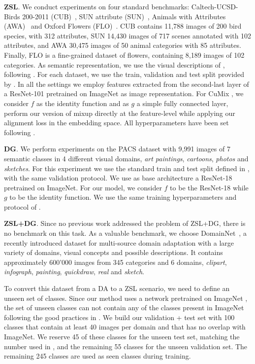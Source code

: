 \documentclass[runningheads]{llncs}
\newcommand{\myparagraph}[1]{\noindent\textbf{#1}}
\newcommand{\methodName}{{CuMix} }
\begin{document}
\myparagraph{ZSL}. We conduct experiments on {four} standard benchmarks: Caltech-UCSD-Birds 200-2011 (CUB)~\cite{welinder2010cub}, SUN attribute (SUN)~\cite{patterson2012sun}, Animals with Attributes (AWA)~\cite{lampert2013awa} and Oxford Flowers (FLO)~\cite{nilsback2008flo}. CUB contains 11,788 images of 200 bird species, with 312 attributes, SUN 14,430 images of 717 scenes annotated with 102 attributes, and AWA 30,475 images of 50 animal categories with 85 attributes. Finally, FLO is a fine-grained dataset of flowers, containing 8,189 images of 102 categories. As semantic representation, we use the visual descriptions of \cite{reed2016learning}, following 
\cite{xian2018feature,xian2019semantic}. For each dataset, we use the train, validation and test split provided by \cite{xian2018zeroshotgood}. In all the settings we employ features extracted from the second-last layer of a ResNet-101 \cite{he2016deep} pretrained on ImageNet as image representation. For \methodName, we consider $f$ as the identity function and as $g$ a simple fully connected layer, perform our version of mixup directly at the feature-level while applying our alignment loss in the embedding space. All hyperparameters have been set following \cite{xian2018zeroshotgood}.

\myparagraph{DG}. We perform experiments on the PACS dataset \cite{li2017deeper}with 9,991 images of 7 semantic classes in 4 different visual domains, \textit{art paintings}, \textit{cartoons}, \textit{photos} and \textit{sketches}. For this experiment we use the standard train and test split defined in \cite{li2017deeper}, with the same validation protocol. We use as base architecture a ResNet-18 \cite{he2016deep} pretrained on ImageNet. For our model, we consider $f$ to be the ResNet-18 while $g$ to be the identity function. We use the same training hyperparameters and protocol of \cite{li2019episodic}. 

\myparagraph{ZSL+DG}. Since no previous work addressed the problem of ZSL+DG, there is no benchmark on this task. As a valuable benchmark, we choose DomainNet~\cite{peng2019moment}, a recently introduced dataset for multi-source domain adaptation \cite{peng2019moment} with a large variety of domains, visual concepts and possible descriptions. It contains approximately 600'000 images from 345 categories and 6 domains,  \textit{clipart}, \textit{infograph}, \textit{painting}, \textit{quickdraw}, \textit{real} and \textit{sketch}. 

To convert this dataset from a DA to a ZSL scenario, we need to define an unseen set of classes. Since our method uses a network pretrained on ImageNet \cite{russakovsky2015imagenet}, the set of unseen classes can not contain any of the classes present in ImageNet following the good practices in \cite{xian2017zero}. We build our validation + test set with 100 classes that contain at least 40 images per domain and that has no overlap with ImageNet. We reserve 45 of these classes for the unseen test set, matching the number used in \cite{thong2019open}, and the remaining 55 classes for the unseen validation set. The remaining 245 classes are used as seen classes during training. 
\end{document}
